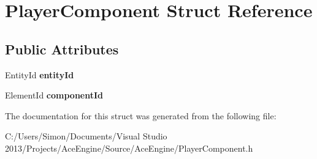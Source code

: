 \hypertarget{struct_player_component}{}\section{Player\+Component Struct Reference}
\label{struct_player_component}
\subsection*{Public Attributes}
\begin{DoxyCompactItemize}
\item 
\hypertarget{struct_player_component_aa0575c3282d6efc66f1bf0fdbf16ced1}{}Entity\+Id {\bfseries entity\+Id}\label{struct_player_component_aa0575c3282d6efc66f1bf0fdbf16ced1}

\item 
\hypertarget{struct_player_component_a78ce9ae88dba1fb44048564dbd26c519}{}Element\+Id {\bfseries component\+Id}\label{struct_player_component_a78ce9ae88dba1fb44048564dbd26c519}

\end{DoxyCompactItemize}


The documentation for this struct was generated from the following file\+:\begin{DoxyCompactItemize}
\item 
C\+:/\+Users/\+Simon/\+Documents/\+Visual Studio 2013/\+Projects/\+Ace\+Engine/\+Source/\+Ace\+Engine/Player\+Component.\+h\end{DoxyCompactItemize}

